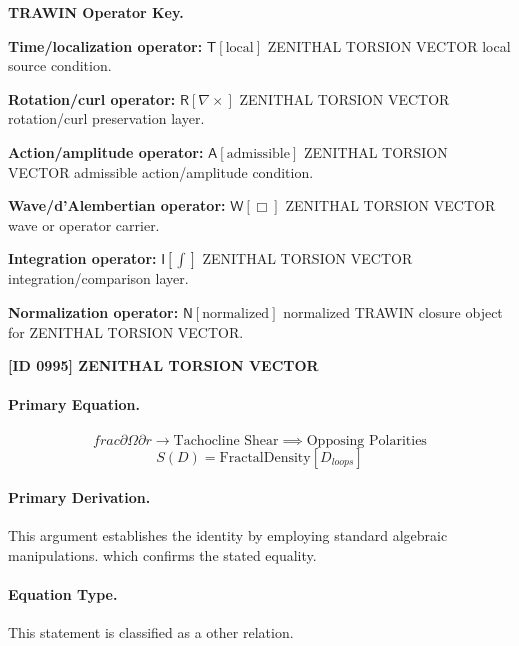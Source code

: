 \par\vspace{0.45\baselineskip}
\noindent\begin{minipage}[t]{\linewidth}
\begingroup
\small
\raggedright
\textbf{TRAWIN Operator Key.}\par
\noindent\textbf{Time/localization operator:} $\mathsf{T}\!\left[\mathrm{local}\right]$ ZENITHAL TORSION VECTOR local source condition.\par
\noindent\textbf{Rotation/curl operator:} $\mathsf{R}\!\left[\nabla\times\right]$ ZENITHAL TORSION VECTOR rotation/curl preservation layer.\par
\noindent\textbf{Action/amplitude operator:} $\mathsf{A}\!\left[\mathrm{admissible}\right]$ ZENITHAL TORSION VECTOR admissible action/amplitude condition.\par
\noindent\textbf{Wave/d'Alembertian operator:} $\mathsf{W}\!\left[\Box\right]$ ZENITHAL TORSION VECTOR wave or operator carrier.\par
\noindent\textbf{Integration operator:} $\mathsf{I}\!\left[\int\right]$ ZENITHAL TORSION VECTOR integration/comparison layer.\par
\noindent\textbf{Normalization operator:} $\mathsf{N}\!\left[\mathrm{normalized}\right]$ normalized TRAWIN closure object for ZENITHAL TORSION VECTOR.\par
\endgroup
\end{minipage}

\clearpage
\noindent\textbf{[ID 0995] ZENITHAL TORSION VECTOR}\par
\vspace{0.35em}
\paragraph{Primary Equation.}
\[
frac{\partial \Omega}{\partial r} \to \text{Tachocline Shear} \implies \text{Opposing Polarities}
\]
\[
S(D) = \text{FractalDensity}[D_{loops}]
\]

\paragraph{Primary Derivation.}
This argument establishes the identity by employing standard algebraic manipulations. which confirms the stated equality.
\paragraph{Equation Type.}
This statement is classified as a other relation.

